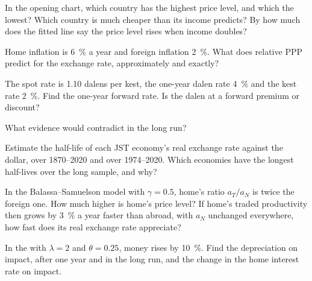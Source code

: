 \begin{exercise}[$\star$]\label{exo:b3:exchange-rates:1}
In the opening chart, which country has the highest price level, and which the
lowest? Which country is much cheaper than its income predicts? By how much does
the fitted line say the price level rises when income doubles?
\end{exercise}

\begin{exercise}[$\star$]\label{exo:b3:exchange-rates:2}
Home inflation is 6~\% a year and foreign inflation 2~\%. What does relative PPP
predict for the exchange rate, approximately and exactly?
\end{exercise}

\begin{exercise}[$\star$]\label{exo:b3:exchange-rates:3}
The spot rate is 1.10 dalens per kest, the one-year dalen rate 4~\% and the kest rate
2~\%. Find the one-year forward rate. Is the dalen at a forward premium or discount?
\end{exercise}

\begin{exercise}[$\star$]\label{exo:b3:exchange-rates:4}
What evidence would contradict  in the long run?
\end{exercise}

\begin{exercise}[$\star\star$]\label{exo:b3:exchange-rates:5}
Estimate the half-life of each JST economy's real exchange rate against the dollar,
over 1870--2020 and over 1974--2020. Which economies have the longest half-lives over
the long sample, and why?
\end{exercise}

\begin{exercise}[$\star\star$]\label{exo:b3:exchange-rates:6}
In the Balassa--Samuelson model with $\gamma = 0.5$, home's ratio $a_T/a_N$ is twice
the foreign one. How much higher is home's price level? If home's traded
productivity then grows by 3~\% a year faster than abroad, with $a_N$ unchanged
everywhere, how fast does its real exchange rate appreciate?
\end{exercise}

\begin{exercise}[$\star\star$]\label{exo:b3:exchange-rates:7}
In the  with $\lambda = 2$ and $\theta = 0.25$, money rises by 10~\%. Find the
depreciation on impact, after one year and in the long run, and the change in the
home interest rate on impact.
\end{exercise}

